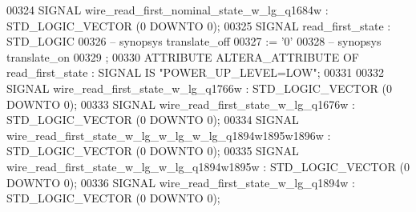 \begin{DoxyCode}
{00324      \textcolor{keywordflow}{SIGNAL}  \textcolor{vhdlchar}{wire_read_first_nominal_state_w_lg_q1684w}  \textcolor{vhdlchar}{:}   \textcolor{comment}{STD\_LOGIC\_VECTOR} \textcolor{vhdlchar}{(}\textcolor{vhdllogic}{}\textcolor{vhdllogic}{0} \textcolor{keywordflow}{DOWNTO} \textcolor{vhdllogic}{}\textcolor{vhdllogic}{0}\textcolor{vhdlchar}{)};
00325      \textcolor{keywordflow}{SIGNAL}  \textcolor{vhdlchar}{read_first_state}   \textcolor{vhdlchar}{:}   \textcolor{comment}{STD\_LOGIC}
00326 \textcolor{keyword}{     -- synopsys translate\_off}
00327       \textcolor{vhdlchar}{:=} \textcolor{vhdlchar}{'}\textcolor{vhdllogic}{}\textcolor{vhdllogic}{0}\textcolor{vhdlchar}{'}
00328 \textcolor{keyword}{     -- synopsys translate\_on}
00329      ;
00330      \textcolor{keywordflow}{ATTRIBUTE} \textcolor{vhdlchar}{ALTERA_ATTRIBUTE} \textcolor{keywordflow}{OF} \textcolor{vhdlchar}{read_first_state} \textcolor{vhdlchar}{:} \textcolor{keywordflow}{SIGNAL} \textcolor{keywordflow}{IS} \textcolor{keyword}{"POWER\_UP\_LEVEL=LOW"};
00331 
00332      \textcolor{keywordflow}{SIGNAL}  \textcolor{vhdlchar}{wire_read_first_state_w_lg_q1766w}  \textcolor{vhdlchar}{:}   \textcolor{comment}{STD\_LOGIC\_VECTOR} \textcolor{vhdlchar}{(}\textcolor{vhdllogic}{}\textcolor{vhdllogic}{0} \textcolor{keywordflow}{DOWNTO} \textcolor{vhdllogic}{}\textcolor{vhdllogic}{0}\textcolor{vhdlchar}{)};
00333      \textcolor{keywordflow}{SIGNAL}  \textcolor{vhdlchar}{wire_read_first_state_w_lg_q1676w}  \textcolor{vhdlchar}{:}   \textcolor{comment}{STD\_LOGIC\_VECTOR} \textcolor{vhdlchar}{(}\textcolor{vhdllogic}{}\textcolor{vhdllogic}{0} \textcolor{keywordflow}{DOWNTO} \textcolor{vhdllogic}{}\textcolor{vhdllogic}{0}\textcolor{vhdlchar}{)};
00334      \textcolor{keywordflow}{SIGNAL}  \textcolor{vhdlchar}{wire_read_first_state_w_lg_w_lg_w_lg_q1894w1895w1896w}  \textcolor{vhdlchar}{:}   \textcolor{comment}{STD\_LOGIC\_VECTOR} \textcolor{vhdlchar}{(}\textcolor{vhdllogic}{}\textcolor{vhdllogic}{0} \textcolor{keywordflow}{DOWNTO} \textcolor{vhdllogic}{}\textcolor{vhdllogic}{0}\textcolor{vhdlchar}{)};
00335      \textcolor{keywordflow}{SIGNAL}  \textcolor{vhdlchar}{wire_read_first_state_w_lg_w_lg_q1894w1895w}    \textcolor{vhdlchar}{:}   \textcolor{comment}{STD\_LOGIC\_VECTOR} \textcolor{vhdlchar}{(}\textcolor{vhdllogic}{}\textcolor{vhdllogic}{0} \textcolor{keywordflow}{DOWNTO} \textcolor{vhdllogic}{}\textcolor{vhdllogic}{0}\textcolor{vhdlchar}{)};
00336      \textcolor{keywordflow}{SIGNAL}  \textcolor{vhdlchar}{wire_read_first_state_w_lg_q1894w}  \textcolor{vhdlchar}{:}   \textcolor{comment}{STD\_LOGIC\_VECTOR} \textcolor{vhdlchar}{(}\textcolor{vhdllogic}{}\textcolor{vhdllogic}{0} \textcolor{keywordflow}{DOWNTO} \textcolor{vhdllogic}{}\textcolor{vhdllogic}{0}\textcolor{vhdlchar}{)};
}
\end{DoxyCode}
